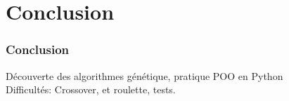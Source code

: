 \documentclass[16pt]{beamer}
\begin{document}
\section{Conclusion}

\begin{frame}
  \frametitle{Conclusion}
  \pause{}
  Découverte des algorithmes génétique, pratique POO en Python \pause{} \\
  Difficultés: Crossover, et roulette, tests.
\end{frame}
\end{document}
